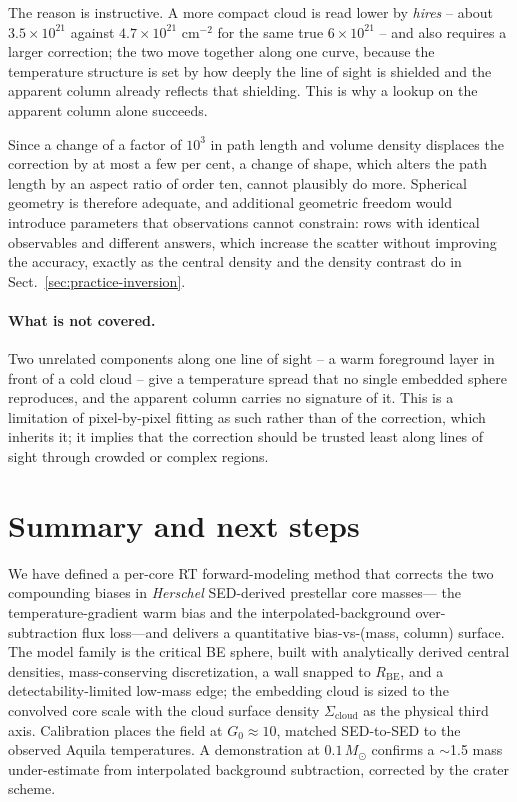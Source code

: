 \documentclass[11pt,a4paper]{article}
\newcommand{\msun}{M_{\odot}}
\newcommand{\Rbe}{R_{\mathrm{BE}}}
\newcommand{\Scloud}{\Sigma_{\mathrm{cloud}}}
\begin{document}
The reason is instructive. A more compact cloud is read lower by \emph{hires}
-- about $3.5\times10^{21}$ against $4.7\times10^{21}$ cm$^{-2}$ for the same
true $6\times10^{21}$ -- and also requires a larger correction; the two move
together along one curve, because the temperature structure is set by how deeply
the line of sight is shielded and the apparent column already reflects that
shielding. This is why a lookup on the apparent column alone succeeds.

Since a change of a factor of $10^{3}$ in path length and volume density
displaces the correction by at most a few per cent, a change of shape, which
alters the path length by an aspect ratio of order ten, cannot plausibly do
more. Spherical geometry is therefore adequate, and additional geometric freedom
would introduce parameters that observations cannot constrain: rows with
identical observables and different answers, which increase the scatter without
improving the accuracy, exactly as the central density and the density contrast
do in Sect.~\ref{sec:practice-inversion}.

\paragraph{What is not covered.} Two unrelated components along one line of
sight -- a warm foreground layer in front of a cold cloud -- give a temperature
spread that no single embedded sphere reproduces, and the apparent column
carries no signature of it. This is a limitation of pixel-by-pixel fitting as
such rather than of the correction, which inherits it; it implies that the
correction should be trusted least along lines of sight through crowded or
complex regions.

\section{Summary and next steps}

We have defined a per-core RT forward-modeling method that corrects the two
compounding biases in \emph{Herschel} SED-derived prestellar core masses---
the temperature-gradient warm bias and the interpolated-background
over-subtraction flux loss---and delivers a quantitative bias-vs-(mass,
column) surface. The model family is the critical BE sphere, built with
analytically derived central densities, mass-conserving discretization, a
wall snapped to $\Rbe$, and a detectability-limited low-mass edge; the
embedding cloud is sized to the convolved core scale with the cloud surface
density $\Scloud$ as the physical third axis. Calibration places the field
at $G_{0}\approx 10$, matched SED-to-SED to the observed Aquila temperatures.
A demonstration at $0.1\,\msun$ confirms a $\sim$1.5 mass under-estimate from
interpolated background subtraction, corrected by the crater scheme.
\end{document}
